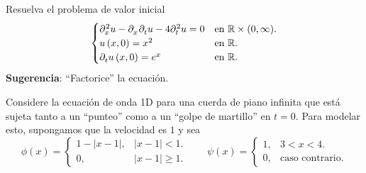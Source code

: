 \question

Resuelva el problema de valor inicial
\begin{equation*}
	\begin{cases}
		\difcp[2]{u}{x}-
		\difcp{u}{x,t}-
		4\difcp[2]{u}{t}=0                 &
		\text{en }\mathbb{R}\times(0,\infty). \\
		u\left(x,0\right)=
		x^{2}                              &
		\text{en }\mathbb{R}.                 \\
		\difcp{u}{t}\left(x,0\right)=e^{x} &
		\text{en }\mathbb{R}.
	\end{cases}
\end{equation*}
\textbf{Sugerencia}: ``Factorice'' la ecuación.

\question

Considere la ecuación de onda 1D para una cuerda de piano infinita
que está sujeta tanto a un ``punteo'' como a un ``golpe de martillo''
en $t=0$.
Para modelar esto, supongamos que la velocidad es $1$ y sea
\begin{equation*}
	\phi\left(x\right)=
	\begin{cases}
		1-\left|x-1\right|, & \left|x-1\right|<1.     \\
		0,                  & \left|x-1\right|\geq 1.
	\end{cases}\qquad
	\psi\left(x\right)=
	\begin{cases}
		1, & 3<x<4.                 \\
		0, & \text{caso contrario}.
	\end{cases}
\end{equation*}



